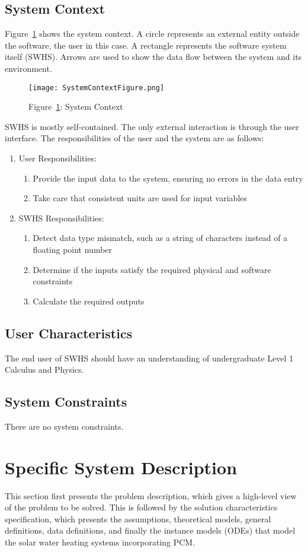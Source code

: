 \documentclass[12pt]{article}
\begin{document}
\subsection{System Context}
\label{Sec:SC}
Figure~\ref{Figure::SC} shows the system context. A circle represents an external entity outside the software, the user in this case. A rectangle represents the software system itself (SWHS). Arrows are used to show the data flow between the system and its environment.
\begin{figure}
\begin{center}
\texttt{[image: SystemContextFigure.png]}
\caption{Figure~\ref{Figure::SC}: System Context}
\label{Figure::SC}
\end{center}
\end{figure}
SWHS is mostly self-contained. The only external interaction is through the user interface. The responsibilities of the user and the system are as follows:
\begin{enumerate}
\item{User Responsibilities:}
\begin{enumerate}
\item{Provide the input data to the system, ensuring no errors in the data entry}
\item{Take care that consistent units are used for input variables}
\end{enumerate}
\item{SWHS Responsibilities:}
\begin{enumerate}
\item{Detect data type mismatch, such as a string of characters instead of a floating point number}
\item{Determine if the inputs satisfy the required physical and software constraints}
\item{Calculate the required outputs}
\end{enumerate}
\end{enumerate}
\subsection{User Characteristics}
\label{Sec:UC}
The end user of SWHS should have an understanding of undergraduate Level 1 Calculus and Physics.
\subsection{System Constraints}
\label{Sec:SC}
There are no system constraints.
\section{Specific System Description}
\label{Sec:SSD}
This section first presents the problem description, which gives a high-level view of the problem to be solved. This is followed by the solution characteristics specification, which presents the assumptions, theoretical models, general definitions, data definitions, and finally the instance models (ODEs) that model the solar water heating systems incorporating PCM.
\end{document}
